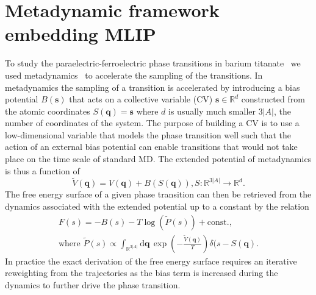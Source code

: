 \section{Metadynamic framework embedding MLIP}
To study the paraelectric-ferroelectric phase transitions in barium titanate~\cite{gigli2023modeling} we used metadynamics~\cite{bussi2020using} to accelerate the sampling of the transitions.
In metadynamics the sampling of a transition is accelerated by introducing a bias potential $B(\mathbf{s})$ that acts on a collective variable (CV) $\mathbf{s}\in\mathbb{R}^d$ constructed from the atomic coordinates $S(\mathbf{q}) = \mathbf{s}$ where $d$ is usually much smaller $3|A|$, the number of coordinates of the system.
The purpose of building a CV is to use a low-dimensional variable that models the phase transition well such that the action of an external bias potential can enable transitions that would not take place on the time scale of standard MD.
The extended potential of metadynamics is thus a function of
\begin{equation}
  \tilde{V}(\mathbf{q}) = V(\mathbf{q}) + B(S(\mathbf{q})), S:\mathbb{R}^{3|A|}\rightarrow\mathbb{R}^d.
\end{equation}
The free energy surface of a given phase transition can then be retrieved from the dynamics associated with the extended potential up to a constant by the relation 
\begin{subequations}
\begin{gather}
  F(s) = -B(s) - T\log(\tilde{P}(s)) + \textrm{const.}, \\
  \textrm{where } \tilde{P}(s) \propto \int_{\mathbb{R}^{3|A|}}\mathrm{d}\mathbf{q}\, \exp(-\frac{\tilde{V}(\mathbf{q})}{T})\delta(s-S(\mathbf{q}).
\end{gather}
\end{subequations}
In practice the exact derivation of the free energy surface requires an iterative reweighting from the trajectories as the bias term is increased during the dynamics to further drive the phase transition.
